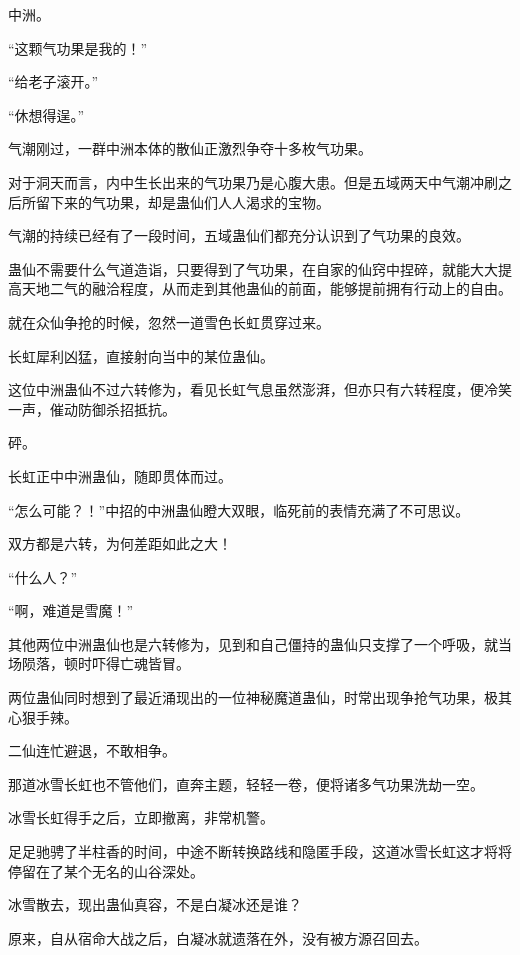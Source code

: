 
\begin{this_body}



中洲。

“这颗气功果是我的！”

“给老子滚开。”

“休想得逞。”

气潮刚过，一群中洲本体的散仙正激烈争夺十多枚气功果。

对于洞天而言，内中生长出来的气功果乃是心腹大患。但是五域两天中气潮冲刷之后所留下来的气功果，却是蛊仙们人人渴求的宝物。

气潮的持续已经有了一段时间，五域蛊仙们都充分认识到了气功果的良效。

蛊仙不需要什么气道造诣，只要得到了气功果，在自家的仙窍中捏碎，就能大大提高天地二气的融洽程度，从而走到其他蛊仙的前面，能够提前拥有行动上的自由。

就在众仙争抢的时候，忽然一道雪色长虹贯穿过来。

长虹犀利凶猛，直接射向当中的某位蛊仙。

这位中洲蛊仙不过六转修为，看见长虹气息虽然澎湃，但亦只有六转程度，便冷笑一声，催动防御杀招抵抗。

砰。

长虹正中中洲蛊仙，随即贯体而过。

“怎么可能？！”中招的中洲蛊仙瞪大双眼，临死前的表情充满了不可思议。

双方都是六转，为何差距如此之大！

“什么人？”

“啊，难道是雪魔！”

其他两位中洲蛊仙也是六转修为，见到和自己僵持的蛊仙只支撑了一个呼吸，就当场陨落，顿时吓得亡魂皆冒。

两位蛊仙同时想到了最近涌现出的一位神秘魔道蛊仙，时常出现争抢气功果，极其心狠手辣。

二仙连忙避退，不敢相争。

那道冰雪长虹也不管他们，直奔主题，轻轻一卷，便将诸多气功果洗劫一空。

冰雪长虹得手之后，立即撤离，非常机警。

足足驰骋了半柱香的时间，中途不断转换路线和隐匿手段，这道冰雪长虹这才将将停留在了某个无名的山谷深处。

冰雪散去，现出蛊仙真容，不是白凝冰还是谁？

原来，自从宿命大战之后，白凝冰就遗落在外，没有被方源召回去。


\end{this_body}
